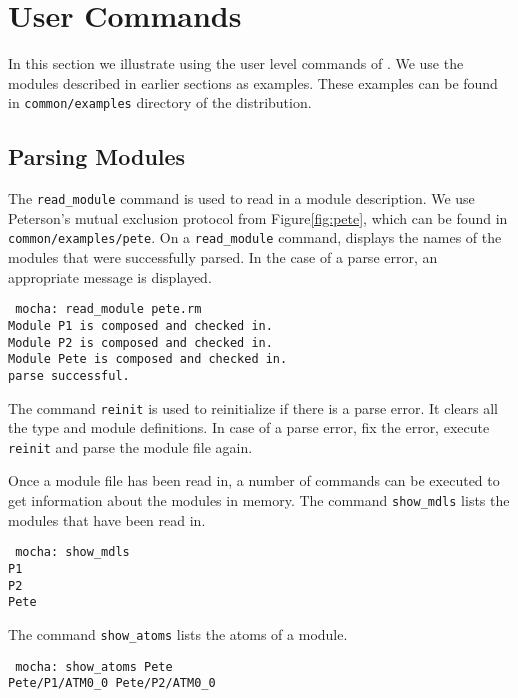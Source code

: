 \section {User Commands}

In this section we illustrate using the user level commands of \mocha.
We use the modules described in earlier sections as examples. 
These examples can be found in {\tt common/examples} directory
of the \mocha distribution.


\subsection{Parsing Modules}
The {\tt read\_module} command is used to read in a module description.
We use  Peterson's mutual exclusion protocol from Figure{\ref{fig:pete}},
which can be found in {\tt common/examples/pete}.
On a {\tt read\_module} command, \mocha displays the names of the modules
that were successfully parsed. In the case of a parse error, an appropriate
message is displayed.

\mypar
{\tt 
mocha: read\_module pete.rm \\
Module P1 is composed and checked in. \\
Module P2 is composed and checked in. \\
Module Pete is composed and checked in. \\
parse successful. \\
}

The command {\tt reinit} is used to reinitialize \mocha if there is a
parse error. It clears all the type and module definitions. In case of
a parse error, fix the error, execute {\tt reinit} and parse the
module file again. 

Once a module file has been read in, a number of commands can be
executed to get information about the modules in memory. 
The command {\tt show\_mdls} lists the modules that have been read in.

\mypar
{\tt
mocha: show\_mdls \\
P1 \\                 
P2 \\                 
Pete \\               
}

The command {\tt show\_atoms} lists the atoms of a module.

\mypar
{\tt
mocha: show\_atoms Pete \\
Pete/P1/ATM0\_0 Pete/P2/ATM0\_0 \\
}

